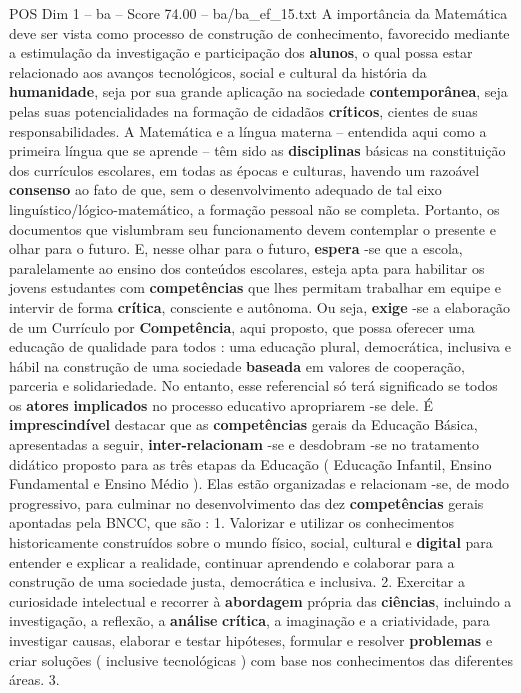 \begin{textsample}{POS Dim 1 – ba – Score 74.00 – ba/ba\_ef\_15.txt}
A importância da Matemática deve ser vista como processo de construção de conhecimento, favorecido mediante a estimulação da investigação e participação dos \textbf{alunos}, o qual possa estar relacionado aos avanços tecnológicos, social e cultural da história da \textbf{humanidade}, seja por sua grande aplicação na sociedade \textbf{contemporânea}, seja pelas suas potencialidades na formação de cidadãos \textbf{críticos}, cientes de suas responsabilidades.
A Matemática e a língua materna – entendida aqui como a primeira língua que se aprende – têm sido as \textbf{disciplinas} básicas na constituição dos currículos escolares, em todas as épocas e culturas, havendo um razoável \textbf{consenso} ao fato de que, sem o desenvolvimento adequado de tal eixo linguístico/lógico-matemático, a formação pessoal não se completa.
Portanto, os documentos que vislumbram seu funcionamento devem contemplar o presente e olhar para o futuro.
E, nesse olhar para o futuro, \textbf{espera} -se que a escola, paralelamente ao ensino dos conteúdos escolares, esteja apta para habilitar os jovens estudantes com \textbf{competências} que lhes permitam trabalhar em equipe e intervir de forma \textbf{crítica}, consciente e autônoma.
Ou seja, \textbf{exige} -se a elaboração de um Currículo por \textbf{Competência}, aqui proposto, que possa oferecer uma educação de qualidade para todos : uma educação plural, democrática, inclusiva e hábil na construção de uma sociedade \textbf{baseada} em valores de cooperação, parceria e solidariedade.
No entanto, esse referencial só terá significado se todos os \textbf{atores} \textbf{implicados} no processo educativo apropriarem -se dele.
É \textbf{imprescindível} destacar que as \textbf{competências} gerais da Educação Básica, apresentadas a seguir, \textbf{inter-relacionam} -se e desdobram -se no tratamento didático proposto para as três etapas da Educação ( Educação Infantil, Ensino Fundamental e Ensino Médio ).
Elas estão organizadas e relacionam -se, de modo progressivo, para culminar no desenvolvimento das dez \textbf{competências} gerais apontadas pela BNCC, que são : 1.
Valorizar e utilizar os conhecimentos historicamente construídos sobre o mundo físico, social, cultural e \textbf{digital} para entender e explicar a realidade, continuar aprendendo e colaborar para a construção de uma sociedade justa, democrática e inclusiva. 2.
Exercitar a curiosidade intelectual e recorrer à \textbf{abordagem} própria das \textbf{ciências}, incluindo a investigação, a reflexão, a \textbf{análise} \textbf{crítica}, a imaginação e a criatividade, para investigar causas, elaborar e testar hipóteses, formular e resolver \textbf{problemas} e criar soluções ( inclusive tecnológicas ) com base nos conhecimentos das diferentes áreas. 3.

\end{textsample}
